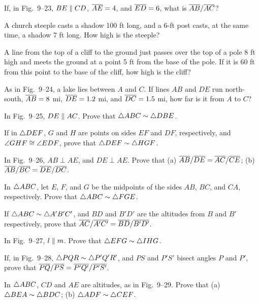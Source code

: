 \documentclass[11pt]{book}
\begin{document}
\begin{exercisecols}
\begin{exlist}
\item If, in Fig.~9--23, $BE \mathrel{\|} CD$, $\overline{AE} = 4$, and $\overline{ED} = 6$, what is
      $\overline{AB}/\overline{AC}$?
\exfig{\FIGIXTWENTYTHREE}
\item A church steeple casts a shadow 100 ft long, and a 6-ft post casts, at the
      same time, a shadow 7 ft long. How high is the steeple?
\item A line from the top of a cliff to the ground just passes over the top of a
      pole 8 ft high and meets the ground at a point 5 ft from the base of the
      pole. If it is 60 ft from this point to the base of the cliff, how high is
      the cliff?
\item As in Fig.~9--24, a lake lies between $A$ and $C$. If lines $AB$ and $DE$
      run north-south, $\overline{AB} = 8$ mi, $\overline{DE} = 1.2$ mi, and $\overline{DC} = 1.5$
      mi, how far is it from $A$ to $C$?
\exfig{\FIGIXTWENTYFOUR}
\item In Fig.~9--25, $DE \mathrel{\|} AC$. Prove that $\triangle ABC \sim \triangle DBE$.
\exfig{\FIGIXTWENTYFIVE}
\item If in $\triangle DEF$, $G$ and $H$ are points on sides $EF$ and $DF$,
      respectively, and $\angle GHF \cong \angle EDF$, prove that $\triangle DEF \sim
      \triangle HGF$.
\item In Fig.~9--26, $AB \perp AE$, and $DE \perp AE$. Prove that (a)
      $\overline{AB}/\overline{DE} = \overline{AC}/\overline{CE}$; (b) $\overline{AB}/\overline{BC} =
      \overline{DE}/\overline{DC}$.
\exfig{\FIGIXTWENTYSIX}
\item In $\triangle ABC$, let $E$, $F$, and $G$ be the midpoints of the sides $AB$,
      $BC$, and $CA$, respectively. Prove that $\triangle ABC \sim \triangle FGE$.
\item If $\triangle ABC \sim \triangle A'B'C'$, and $BD$ and $B'D'$ are the altitudes
      from $B$ and $B'$ respectively, prove that $\overline{AC}/\overline{A'C'} =
      \overline{BD}/\overline{B'D'}$.
\item In Fig.~9--27, $l \mathrel{\|} m$. Prove that $\triangle EFG \sim \triangle IHG$.
\exfig{\FIGIXTWENTYSEVEN}
\item If, in Fig.~9--28, $\triangle PQR \sim \triangle P'Q'R'$, and $PS$ and $P'S'$
      bisect angles $P$ and $P'$, prove that $\overline{PQ}/\overline{PS} =
      \overline{P'Q'}/\overline{P'S'}$.
\exfig{\FIGIXTWENTYEIGHT}
\item In $\triangle ABC$, $CD$ and $AE$ are altitudes, as in Fig.~9--29. Prove that
      (a) $\triangle BEA \sim \triangle BDC$; (b) $\triangle ADF \sim \triangle CEF$.
\exfig{\FIGIXTWENTYNINE}
\end{exlist}
\end{exercisecols}
\end{document}
